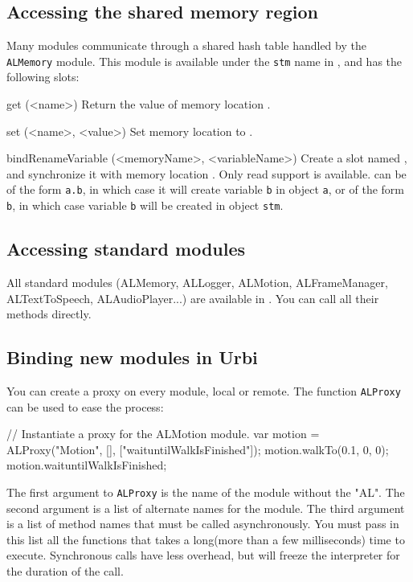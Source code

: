 \subsection{Accessing the \naoqi shared memory region}
Many \naoqi modules communicate through a shared hash table handled by
the \lstinline|ALMemory| module. This module is available under the
\lstinline|stm| name in \urbi, and has the following slots:

\begin{urbiscriptapi}
\item[get](<name>)
  Return the value of memory location .
\item[set](<name>, <value>)
  Set memory location  to .
\item[bindRenameVariable](<memoryName>, <variableName>) Create a \us slot
  named , and synchronize it with memory location
  . Only read support is available.   can
  be of the form \lstinline{a.b}, in which case it will create variable
  \lstinline{b} in object \lstinline{a}, or of the form \lstinline{b}, in
  which case variable \lstinline{b} will be created in object
  \lstinline{stm}.
\end{urbiscriptapi}

\subsection{Accessing standard \naoqi modules}

All standard \naoqi modules (ALMemory, ALLogger, ALMotion, ALFrameManager,
ALTextToSpeech, ALAudioPlayer...) are available in \urbi. You can call all
their methods directly.

\subsection{Binding new \naoqi modules in Urbi}

You can create a proxy on every \naoqi module, local or remote. The function
\lstinline|ALProxy| can be used to ease the process:

\begin{urbiunchecked}
// Instantiate a proxy for the ALMotion module.
var motion = ALProxy("Motion", [], ["waituntilWalkIsFinished"]);
motion.walkTo(0.1, 0, 0);
motion.waituntilWalkIsFinished;
\end{urbiunchecked}

The first argument to \lstinline|ALProxy| is the name of the module without
the "AL". The second argument is a list of alternate names for the module.
The third argument is a list of method names that must be called
asynchronously.  You must pass in this list all the functions that takes a
long(more than a few milliseconds) time to execute. Synchronous calls have
less overhead, but will freeze the \us interpreter for the duration of the
call.

